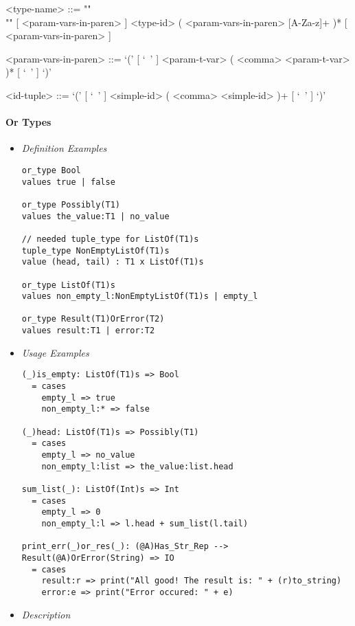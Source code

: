 \documentclass{article}
\begin{document}
\begin{itemize}
\begin{grammar}
<type-name> ::= ""\\""
[ <param-vars-in-paren> ] <type-id> ( <param-vars-in-paren> [A-Za-z]+ )*
[ <param-vars-in-paren> ]

<param-vars-in-paren> ::=
`(' [ `\ ' ] <param-t-var> ( <comma> <param-t-var> )* [ `\ ' ] `)'

<id-tuple> ::= `(' [ `\ ' ] <simple-id> ( <comma> <simple-id> )+ [ `\ ' ] `)'
\end{grammar}

\end{itemize}

\paragraph{Or Types}

\begin{itemize}
\item \textit{Definition Examples}

\begin{verbatim}
or_type Bool
values true | false

or_type Possibly(T1)
values the_value:T1 | no_value

// needed tuple_type for ListOf(T1)s
tuple_type NonEmptyListOf(T1)s
value (head, tail) : T1 x ListOf(T1)s

or_type ListOf(T1)s
values non_empty_l:NonEmptyListOf(T1)s | empty_l

or_type Result(T1)OrError(T2)
values result:T1 | error:T2
\end{verbatim}

\item \textit{Usage Examples}

\begin{verbatim}
(_)is_empty: ListOf(T1)s => Bool
  = cases
    empty_l => true
    non_empty_l:* => false

(_)head: ListOf(T1)s => Possibly(T1)
  = cases
    empty_l => no_value
    non_empty_l:list => the_value:list.head

sum_list(_): ListOf(Int)s => Int
  = cases
    empty_l => 0
    non_empty_l:l => l.head + sum_list(l.tail)

print_err(_)or_res(_): (@A)Has_Str_Rep --> Result(@A)OrError(String) => IO
  = cases
    result:r => print("All good! The result is: " + (r)to_string)
    error:e => print("Error occured: " + e)
\end{verbatim}

\item \textit{Description}


\end{itemize}
\end{document}
